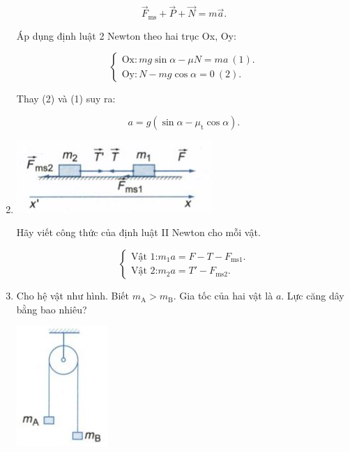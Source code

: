 \begin{enumerate}[label=\bfseries Câu \arabic*:]
{		$$ \vec F_\text{ms} + \vec P + \vec N = m\vec a.$$
		
		
		
		Áp dụng định luật 2 Newton theo hai trục Ox, Oy:
		
		$$\begin{cases}
			\text{Ox}:  mg\sin \alpha - \mu N= ma\ (1).\\
			\text{Oy}: 	N - mg\cos \alpha = 0\ (2).
		\end{cases}$$
		
		Thay (2) và (1) suy ra:
		
		$$a = g(\sin \alpha - \mu_\text{t} \cos \alpha).$$
	}
	\item {}
	
	
	{
		\begin{center}
			\includegraphics[scale=1]{../figs/VN10-2022-PH-TP021-19.jpg}
		\end{center}
		Hãy viết công thức của định luật II Newton cho mỗi vật.
		
	
	}
	
	\hideall
	{
	$$\begin{cases}
		\text{Vật 1:} m_1a = F - T - F_\text{ms1}.\\
		\text{Vật 2:} m_2a = T' - F_\text{ms2}.
	\end{cases}$$
	}
		\item {}
	
	
	{Cho hệ vật như hình. Biết $m_\text{A} > m_\text{B}$. Gia tốc của hai vật là $a$. Lực căng dây bằng bao nhiêu?
		\begin{center}
			\includegraphics[scale=1]{../figs/VN10-2022-PH-TP021-22.jpg}
		\end{center}
	}
	

\end{enumerate}
